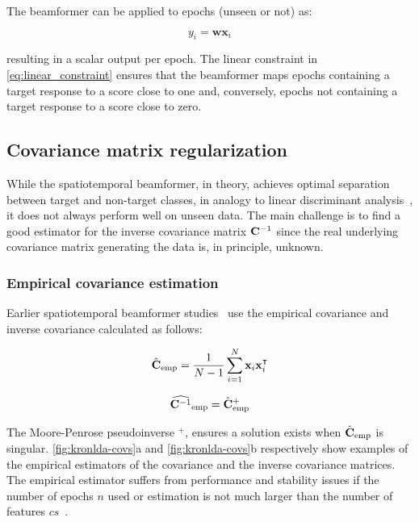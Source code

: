	The beamformer can be applied to epochs (unseen or not) as:

	\begin{equation}
		y_i = \mathbf{w}\mathbf{x}_i
		\label{eq:apply_beamformer}
	\end{equation}

	resulting in a scalar output per epoch.
	The linear constraint in \cref{eq:linear_constraint} ensures that the
	beamformer maps epochs containing a target response to a score close to one
	and, conversely, epochs not containing a target response to a score close to
	zero.

	\subsection{Covariance matrix regularization}
	While the spatiotemporal beamformer, in theory, achieves optimal separation
	between target and non-target classes, in analogy to linear discriminant
  analysis~\cite{Treder201}, it does not always perform well on unseen data.
	The main challenge is to find a good estimator for the inverse covariance
  matrix $\mathbf{C}^{-1}$ since the real underlying covariance matrix generating the data is, in principle, unknown.

	\subsubsection{Empirical covariance estimation}
	\label{sec:empirical_covariance}
	Earlier spatiotemporal beamformer studies~\cite{Wittevrongel2016,
		Wittevrongel2016a, Wittevrongel2017, Wittevrongel2017a} use the empirical
	covariance and inverse covariance calculated as follows:

	\begin{equation}
    \hat{\mathbf{C}}_\text{emp} =
		\frac{1}{N-1}\sum^{N}_{i=1}\mathbf{x}_i\mathbf{x}_i^\intercal
		\label{eq:empirical_covariance}
	\end{equation}


	\begin{equation}
    \widehat{\mathbf{C}^{-1}}_\text{emp} = \hat{\mathbf{C}}_\text{emp}^+
		\label{eq:empirical_inverse_covariance}
	\end{equation}

	The Moore-Penrose pseudoinverse $^+$, ensures a solution exists when
  $\hat{\mathbf{C}}_\text{emp}$ is singular.
	\cref{fig:kronlda-covs}a and \cref{fig:kronlda-covs}b respectively show examples of the
	empirical estimators of the covariance and the inverse covariance matrices.
	The empirical estimator suffers from performance and
	stability issues if the number of epochs $n$ used or estimation is not much larger than the number of features $cs$~\cite{Stein1956,Khatri1987}.

